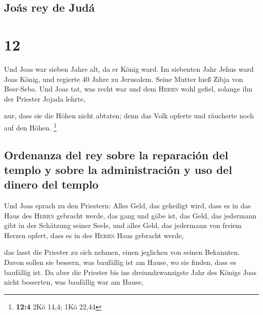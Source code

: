 \hypertarget{jouxe1s-rey-de-juduxe1}{%
\subsection{Joás rey de Judá}\label{jouxe1s-rey-de-juduxe1}}

\hypertarget{section-11}{%
\section{12}\label{section-11}}

 Und Joas war sieben Jahre alt, da er König ward.
 Im siebenten Jahr Jehus ward Joas König, und regierte 40
Jahre zu Jerusalem. Seine Mutter hieß Zibja von Beer-Seba.
 Und Joas tat, was recht war und dem \textsc{Herrn} wohl
gefiel, solange ihn der Priester Jojada lehrte,

 nur, dass sie die Höhen nicht abtaten; denn das Volk
opferte und räucherte noch auf den Höhen. \footnote{\textbf{12:4} 2Kö
  14,4; 1Kö 22,44}

\hypertarget{ordenanza-del-rey-sobre-la-reparaciuxf3n-del-templo-y-sobre-la-administraciuxf3n-y-uso-del-dinero-del-templo}{%
\subsection{Ordenanza del rey sobre la reparación del templo y sobre la
administración y uso del dinero del
templo}\label{ordenanza-del-rey-sobre-la-reparaciuxf3n-del-templo-y-sobre-la-administraciuxf3n-y-uso-del-dinero-del-templo}}

 Und Joas sprach zu den Priestern: Alles Geld, das
geheiligt wird, dass es in das Haus des \textsc{Herrn} gebracht werde,
das gang und gäbe ist, das Geld, das jedermann gibt in der Schätzung
seiner Seele, und alles Geld, das jedermann von freiem Herzen opfert,
dass es in des \textsc{Herrn} Haus gebracht werde,

 das lasst die Priester zu sich nehmen, einen jeglichen
von seinen Bekannten. Davon sollen sie bessern, was baufällig ist am
Hause, wo sie finden, dass es baufällig ist.  Da aber die
Priester bis ins dreiundzwanzigste Jahr des Königs Joas nicht besserten,
was baufällig war am Hause,

